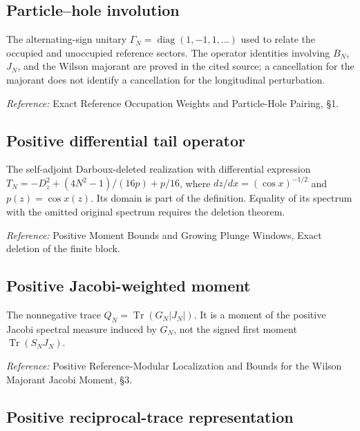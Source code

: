 \documentclass[
  10pt,
  a4paper,
]{article}
\begin{document}
\subsection{Particle--hole involution}\label{particlehole-involution}

The alternating-sign unitary \(\Gamma_N=\operatorname{diag}(1,-1,1,\ldots)\) used to relate the occupied and unoccupied reference sectors. The operator identities involving \(B_N\), \(J_N\), and the Wilson majorant are proved in the cited source; a cancellation for the majorant does not identify a cancellation for the longitudinal perturbation.

\nopagebreak[4]

\emph{Reference:} Exact Reference Occupation Weights and Particle-Hole Pairing, §1.

\subsection{Positive differential tail operator}\label{positive-differential-tail-operator}

The self-adjoint Darboux-deleted realization with differential expression \(T_N=-D_z^2+(4N^2-1)/(16p)+p/16\), where \(dz/dx=(\cos x)^{-1/2}\) and \(p(z)=\cos x(z)\). Its domain is part of the definition. Equality of its spectrum with the omitted original spectrum requires the deletion theorem.

\nopagebreak[4]

\emph{Reference:} Positive Moment Bounds and Growing Plunge Windows, Exact deletion of the finite block.

\subsection{Positive Jacobi-weighted moment}\label{positive-jacobi-weighted-moment}

The nonnegative trace \(Q_N=\operatorname{Tr}(G_N|J_N|)\). It is a moment of the positive Jacobi spectral measure induced by \(G_N\), not the signed first moment \(\operatorname{Tr}(S_NJ_N)\).

\nopagebreak[4]

\emph{Reference:} Positive Reference-Modular Localization and Bounds for the Wilson Majorant Jacobi Moment, §3.

\subsection{Positive reciprocal-trace representation}\label{positive-reciprocal-trace-representation}
\end{document}
